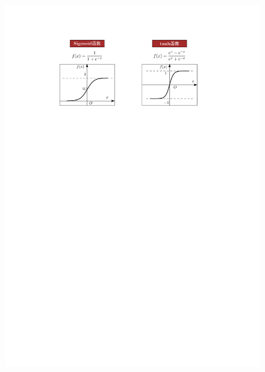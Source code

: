 \begin{itemize}
\begin{figure}[htbp]
        \includegraphics{image/连续非线性作用函数.pdf}
    \end{figure}
    

\end{itemize}
